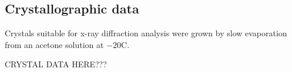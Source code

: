 \begin{refsection}
\subsection{Crystallographic data}
Crystals suitable for x-ray diffraction analysis were grown by slow evaporation from an acetone solution at $-20$\degree{}C.

CRYSTAL DATA HERE???

\printbibliography[heading=subbibliography]
\end{refsection}